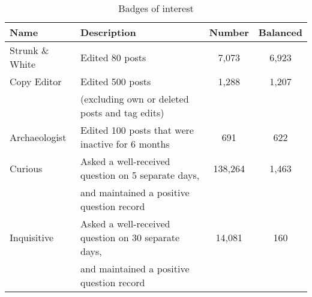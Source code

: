 \begin{table}
  \centering
  \begin{tabular}{llcc}
    \hline
    Name & Description & Number & Balanced \\
    \hline
    Strunk \& White & Edited 80 posts & 7,073 & 6,923 \\
    Copy Editor & Edited 500 posts & 1,288 & 1,207 \\
                & (excluding own or deleted posts and tag edits) & & \\
    Archaeologist & Edited 100 posts that were inactive for 6 months & 691 & 622 \\
    Curious & Asked a well-received question on 5 separate days, & 138,264 & 1,463 \\
            & and maintained a positive question record & & \\
    Inquisitive & Asked a well-received question on 30 separate days, & 14,081 & 160 \\
                & and maintained a positive question record & & \\
    \hline
  \end{tabular}
  \caption{Badges of interest}
  \label{tab:badges}
\end{table}
